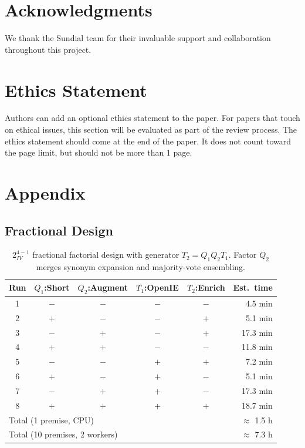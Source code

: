 \documentclass{article} %
\begin{document}
\section*{Acknowledgments}
We thank the Sundial team for their invaluable support and
collaboration throughout this project.


\section*{Ethics Statement}
Authors can add an optional ethics statement to the paper. 
For papers that touch on ethical issues, this section will be evaluated as part of the review process. The ethics statement should come at the end of the paper. It does not count toward the page limit, but should not be more than 1 page. 






\newpage
\appendix
\section{Appendix}

\subsection{Fractional Design }

\begin{table}[ht]
\centering
\caption{$2^{4-1}_{IV}$ fractional factorial design with generator $T_2=Q_1 Q_2 T_1$.
  Factor $Q_2$ merges synonym expansion and majority-vote ensembling.}
\label{tab:factorial-design}
\begin{tabular}{c cccc r}
\toprule
Run & $Q_1$:Short & $Q_2$:Augment & $T_1$:OpenIE & $T_2$:Enrich & Est.\ time \\
\midrule
1 & $-$ & $-$ & $-$ & $-$ &  4.5 min \\
2 & $+$ & $-$ & $-$ & $+$ &  5.1 min \\
3 & $-$ & $+$ & $-$ & $+$ & 17.3 min \\
4 & $+$ & $+$ & $-$ & $-$ & 11.8 min \\
5 & $-$ & $-$ & $+$ & $+$ &  7.2 min \\
6 & $+$ & $-$ & $+$ & $-$ &  5.1 min \\
7 & $-$ & $+$ & $+$ & $-$ & 17.3 min \\
8 & $+$ & $+$ & $+$ & $+$ & 18.7 min \\
\midrule
\multicolumn{5}{l}{Total (1 premise, CPU)} & $\approx$ 1.5 h \\
\multicolumn{5}{l}{Total (10 premises, 2 workers)} & $\approx$ 7.3 h \\
\bottomrule
\end{tabular}
\end{table}
\end{document}
